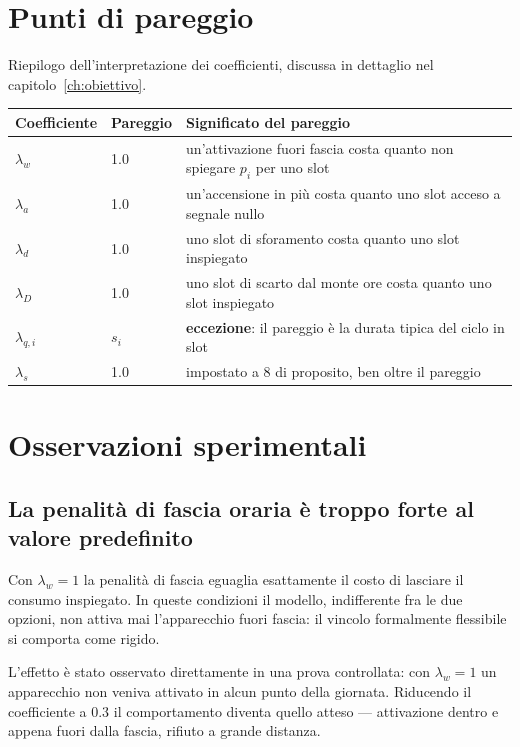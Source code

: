 \section{Punti di pareggio}

Riepilogo dell'interpretazione dei coefficienti, discussa in dettaglio nel
capitolo~\ref{ch:obiettivo}.

\begin{center}
\begin{tabularx}{\textwidth}{@{}l l X@{}}
\toprule
\textbf{Coefficiente} & \textbf{Pareggio} & \textbf{Significato del pareggio} \\
\midrule
$\lambda_w$ & 1.0 & un'attivazione fuori fascia costa quanto non spiegare $p_i$ per uno slot \\
$\lambda_a$ & 1.0 & un'accensione in più costa quanto uno slot acceso a segnale nullo \\
$\lambda_d$ & 1.0 & uno slot di sforamento costa quanto uno slot inspiegato \\
$\lambda_D$ & 1.0 & uno slot di scarto dal monte ore costa quanto uno slot inspiegato \\
$\lambda_{q,i}$ & $s_i$ & \textbf{eccezione}: il pareggio è la durata tipica del ciclo in slot \\
$\lambda_s$ & 1.0 & impostato a 8 di proposito, ben oltre il pareggio \\
\bottomrule
\end{tabularx}
\end{center}

\section{Osservazioni sperimentali}

\subsection{La penalità di fascia oraria è troppo forte al valore predefinito}

Con $\lambda_w = 1$ la penalità di fascia eguaglia esattamente il costo di lasciare il consumo
inspiegato. In queste condizioni il modello, indifferente fra le due opzioni, non attiva mai
l'apparecchio fuori fascia: il vincolo formalmente flessibile si comporta come rigido.

L'effetto è stato osservato direttamente in una prova controllata: con $\lambda_w = 1$ un
apparecchio non veniva attivato in alcun punto della giornata. Riducendo il coefficiente a $0.3$ il
comportamento diventa quello atteso --- attivazione dentro e appena fuori dalla fascia, rifiuto a
grande distanza.

